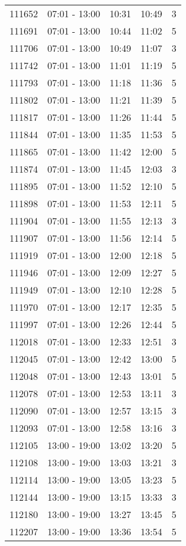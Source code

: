 \documentclass{article}
\begin{document}
\begin{tabular}{llccc}
111652 & 07:01 - 13:00 & 10:31 & 10:49 & 3 \\
111691 & 07:01 - 13:00 & 10:44 & 11:02 & 5 \\
111706 & 07:01 - 13:00 & 10:49 & 11:07 & 3 \\
111742 & 07:01 - 13:00 & 11:01 & 11:19 & 5 \\
111793 & 07:01 - 13:00 & 11:18 & 11:36 & 5 \\
111802 & 07:01 - 13:00 & 11:21 & 11:39 & 5 \\
111817 & 07:01 - 13:00 & 11:26 & 11:44 & 5 \\
111844 & 07:01 - 13:00 & 11:35 & 11:53 & 5 \\
111865 & 07:01 - 13:00 & 11:42 & 12:00 & 5 \\
111874 & 07:01 - 13:00 & 11:45 & 12:03 & 3 \\
111895 & 07:01 - 13:00 & 11:52 & 12:10 & 5 \\
111898 & 07:01 - 13:00 & 11:53 & 12:11 & 5 \\
111904 & 07:01 - 13:00 & 11:55 & 12:13 & 3 \\
111907 & 07:01 - 13:00 & 11:56 & 12:14 & 5 \\
111919 & 07:01 - 13:00 & 12:00 & 12:18 & 5 \\
111946 & 07:01 - 13:00 & 12:09 & 12:27 & 5 \\
111949 & 07:01 - 13:00 & 12:10 & 12:28 & 5 \\
111970 & 07:01 - 13:00 & 12:17 & 12:35 & 5 \\
111997 & 07:01 - 13:00 & 12:26 & 12:44 & 5 \\
112018 & 07:01 - 13:00 & 12:33 & 12:51 & 3 \\
112045 & 07:01 - 13:00 & 12:42 & 13:00 & 5 \\
112048 & 07:01 - 13:00 & 12:43 & 13:01 & 5 \\
112078 & 07:01 - 13:00 & 12:53 & 13:11 & 3 \\
112090 & 07:01 - 13:00 & 12:57 & 13:15 & 3 \\
112093 & 07:01 - 13:00 & 12:58 & 13:16 & 3 \\
112105 & 13:00 - 19:00 & 13:02 & 13:20 & 5 \\
112108 & 13:00 - 19:00 & 13:03 & 13:21 & 3 \\
112114 & 13:00 - 19:00 & 13:05 & 13:23 & 5 \\
112144 & 13:00 - 19:00 & 13:15 & 13:33 & 3 \\
112180 & 13:00 - 19:00 & 13:27 & 13:45 & 5 \\
112207 & 13:00 - 19:00 & 13:36 & 13:54 & 5 \\

\end{tabular}
\end{document}
